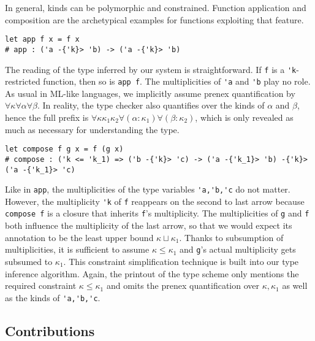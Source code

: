 In general, kinds can be polymorphic and constrained. Function
application and composition are the archetypical
examples for functions exploiting that feature.
\begin{lstlisting}
let app f x = f x
# app : ('a -{'k}> 'b) -> ('a -{'k}> 'b)
\end{lstlisting}
The reading of the type inferred by our system is straightforward. If
\lstinline/f/ is a \lstinline/'k/-restricted function, then so is
\lstinline/app f/. The multiplicities of \lstinline/'a/ and
\lstinline/'b/ play no role. As usual in ML-like languages, we
implicitly assume prenex quantification by
$\forall\kappa\forall\alpha\forall\beta$. In reality, the
type checker also quantifies over the kinds of $\alpha$ and $\beta$,
hence the full prefix is
$\forall\kappa\kappa_1\kappa_2\forall(\alpha:\kappa_1)\forall(\beta:\kappa_2)$,
which is only revealed as much as necessary for understanding the type. 
\begin{lstlisting}
let compose f g x = f (g x) 
# compose : ('k <= 'k_1) => ('b -{'k}> 'c) -> ('a -{'k_1}> 'b) -{'k}> ('a -{'k_1}> 'c)
\end{lstlisting}
Like in \lstinline/app/, the multiplicities of the type variables
\lstinline/'a,'b,'c/ do not matter. However, the multiplicity
\lstinline/'k/ of \lstinline/f/ reappears on the second to last arrow
because \lstinline/compose f/ is a closure that inherits
\lstinline/f/'s multiplicity. The multiplicities of \lstinline/g/  and
\lstinline/f/ both influence the multiplicity of the last arrow, so
that we would expect its annotation to be the least upper bound
$\kappa \sqcup \kappa_1$. Thanks to subsumption of multiplicities, it
is sufficient to assume $\kappa \le \kappa_1$ and \lstinline/g/'s
actual multiplicity gets subsumed to $\kappa_1$. This constraint
simplification technique is built into our type inference algorithm. Again, the printout
of the type scheme only mentions the required constraint
$\kappa\le\kappa_1$ and omits the prenex quantification over $\kappa,
\kappa_1$ as well as the kinds of \lstinline/'a,'b,'c/.

\subsection{Contributions}
\label{sec:contributions}

